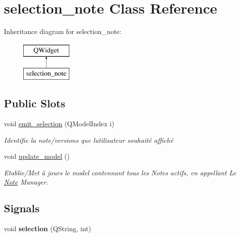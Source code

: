 \hypertarget{classselection__note}{}\section{selection\+\_\+note Class Reference}
\label{classselection__note}
Inheritance diagram for selection\+\_\+note\+:\begin{figure}[H]
\begin{center}
\leavevmode
\includegraphics[height=2.000000cm]{classselection__note}
\end{center}
\end{figure}
\subsection*{Public Slots}
\begin{DoxyCompactItemize}
\item 
void \hyperlink{classselection__note_a70f407c89a87e5d8ce992f18ef64773d}{emit\+\_\+selection} (Q\+Model\+Index i)
\begin{DoxyCompactList}\small\item\em Identifie la note/versions que l\textquotesingle{}utilisateur souhaité affiché \end{DoxyCompactList}\item 
\mbox{\label{classselection__note_aab004424eba4264628d2e01108f2e63b}} 
void \hyperlink{classselection__note_aab004424eba4264628d2e01108f2e63b}{update\+\_\+model} ()
\begin{DoxyCompactList}\small\item\em Etablie/\+Met à jours le model contennant tous les Notes actifs, en appellant Le \hyperlink{class_note}{Note} Manager. \end{DoxyCompactList}\end{DoxyCompactItemize}
\subsection*{Signals}
\begin{DoxyCompactItemize}
\item 
\mbox{\label{classselection__note_ae1cc0e50817dcb45975fa33c9231ef0b}} 
void {\bfseries selection} (Q\+String, int)
\end{DoxyCompactItemize}
